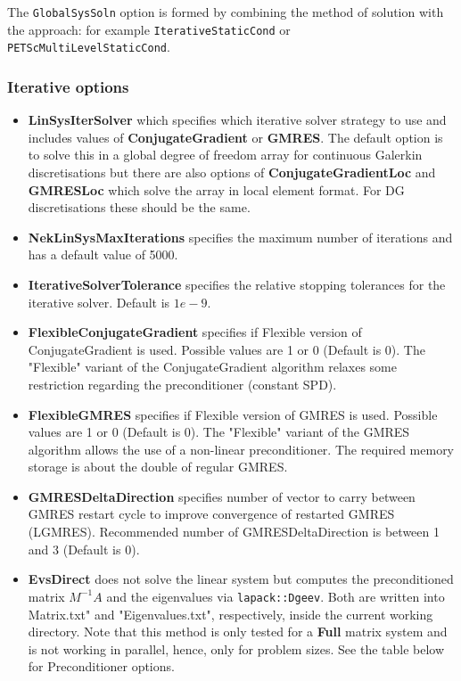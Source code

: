 The \texttt{GlobalSysSoln} option is formed by combining the method of solution
with the approach: for example \texttt{IterativeStaticCond} or
\texttt{PETScMultiLevelStaticCond}.

\subsubsection{Iterative  options}
\begin{itemize}
\item \textbf{LinSysIterSolver} which specifies which iterative solver
  strategy to use and includes values of \textbf{ConjugateGradient} or
  \textbf{GMRES}. The default option is to solve this in a global
  degree of freedom array for continuous Galerkin discretisations but
  there are also options of \textbf{ConjugateGradientLoc} and
  \textbf{GMRESLoc} which solve the array in local element format. For
  DG discretisations these should be the same.
\item \textbf{NekLinSysMaxIterations} specifies the maximum number of
  iterations and has a default value of 5000.
\item \textbf{IterativeSolverTolerance} specifies the relative
  stopping tolerances for the iterative solver. Default is $1e-9$.
\item \textbf{FlexibleConjugateGradient} specifies if Flexible version of 
  ConjugateGradient is used. Possible values are 1 or 0 (Default is 0). 
  The "Flexible" variant of the ConjugateGradient algorithm relaxes some 
  restriction regarding the preconditioner (constant SPD).
\item \textbf{FlexibleGMRES} specifies if Flexible version of GMRES is used. 
  Possible values are 1 or 0 (Default is 0). The "Flexible" variant of the 
  GMRES algorithm allows the use of a non-linear preconditioner. The required
  memory storage is about the double of regular GMRES.
\item \textbf{GMRESDeltaDirection} specifies number of vector to carry between
  GMRES restart cycle to improve convergence of restarted GMRES (LGMRES). Recommended
  number of GMRESDeltaDirection is between 1 and 3 (Default is 0). 
\item \textbf{EvsDirect} does not solve the linear system but computes the preconditioned matrix $M^{-1}A$ and the eigenvalues via \verb!lapack::Dgeev!. Both are written into Matrix.txt" and "Eigenvalues.txt", respectively, inside the current working directory. Note that this method is only tested for a \textbf{Full} matrix system and is not working in parallel, hence, only for problem sizes. See the table below for Preconditioner options.
\end{itemize} 


